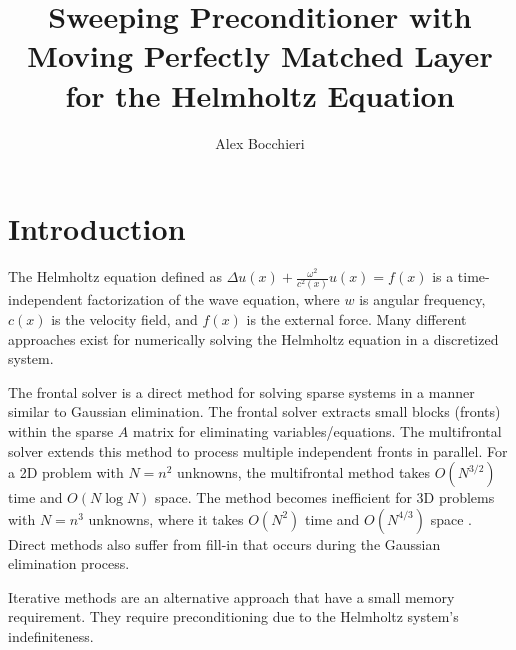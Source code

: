 \documentclass[11pt]{article}
\title{\vspace{-4.0cm}Sweeping Preconditioner with Moving Perfectly Matched Layer for the Helmholtz Equation}
\author{Alex Bocchieri}
\date{}
\begin{document}
\maketitle

\section{Introduction}
The Helmholtz equation defined as $\Delta u(x) + \frac{\omega^2}{c^2(x)}u(x)=f(x)$ is a time-independent factorization of the wave equation, where $w$ is angular frequency, $c(x)$ is the velocity field, and $f(x)$ is the external force. Many different approaches exist for numerically solving the Helmholtz equation in a discretized system. 

The frontal solver \cite{irons1970frontal} is a direct method for solving sparse systems in a manner similar to Gaussian elimination. The frontal solver extracts small blocks (fronts) within the sparse $A$ matrix for eliminating variables/equations. The multifrontal solver \cite{duff1983multifrontal} extends this method to process multiple independent fronts in parallel. For a 2D problem with $N=n^2$ unknowns, the multifrontal method takes $O(N^{3/2})$ time and $O(N \log N)$ space. The method becomes inefficient for 3D problems with $N=n^3$ unknowns, where it takes $O(N^2)$ time and $O(N^{4/3})$ space \cite{engquist2011matrix}. Direct methods also suffer from fill-in \cite{erlangga2008advances} that occurs during the Gaussian elimination process.

Iterative methods are an alternative approach that have a small memory requirement. They require preconditioning due to the Helmholtz system's indefiniteness. 



\cite{engquist2011pml} \cite{engquist2011matrix}






\end{document}
